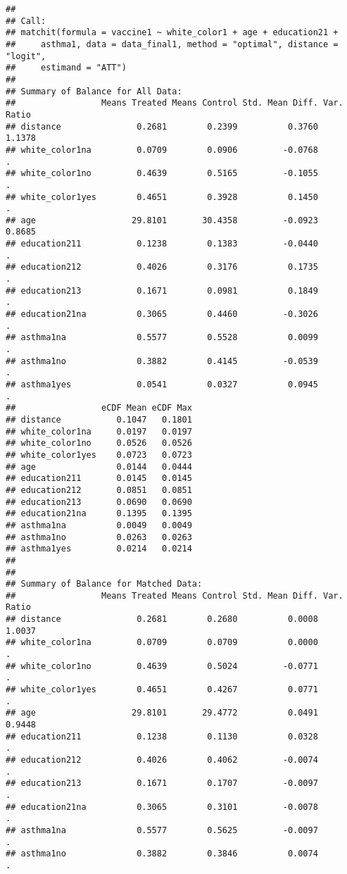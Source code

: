 \documentclass[
]{article}
\begin{document}
\begin{verbatim}
## 
## Call:
## matchit(formula = vaccine1 ~ white_color1 + age + education21 + 
##     asthma1, data = data_final1, method = "optimal", distance = "logit", 
##     estimand = "ATT")
## 
## Summary of Balance for All Data:
##                 Means Treated Means Control Std. Mean Diff. Var. Ratio
## distance               0.2681        0.2399          0.3760     1.1378
## white_color1na         0.0709        0.0906         -0.0768          .
## white_color1no         0.4639        0.5165         -0.1055          .
## white_color1yes        0.4651        0.3928          0.1450          .
## age                   29.8101       30.4358         -0.0923     0.8685
## education211           0.1238        0.1383         -0.0440          .
## education212           0.4026        0.3176          0.1735          .
## education213           0.1671        0.0981          0.1849          .
## education21na          0.3065        0.4460         -0.3026          .
## asthma1na              0.5577        0.5528          0.0099          .
## asthma1no              0.3882        0.4145         -0.0539          .
## asthma1yes             0.0541        0.0327          0.0945          .
##                 eCDF Mean eCDF Max
## distance           0.1047   0.1801
## white_color1na     0.0197   0.0197
## white_color1no     0.0526   0.0526
## white_color1yes    0.0723   0.0723
## age                0.0144   0.0444
## education211       0.0145   0.0145
## education212       0.0851   0.0851
## education213       0.0690   0.0690
## education21na      0.1395   0.1395
## asthma1na          0.0049   0.0049
## asthma1no          0.0263   0.0263
## asthma1yes         0.0214   0.0214
## 
## 
## Summary of Balance for Matched Data:
##                 Means Treated Means Control Std. Mean Diff. Var. Ratio
## distance               0.2681        0.2680          0.0008     1.0037
## white_color1na         0.0709        0.0709          0.0000          .
## white_color1no         0.4639        0.5024         -0.0771          .
## white_color1yes        0.4651        0.4267          0.0771          .
## age                   29.8101       29.4772          0.0491     0.9448
## education211           0.1238        0.1130          0.0328          .
## education212           0.4026        0.4062         -0.0074          .
## education213           0.1671        0.1707         -0.0097          .
## education21na          0.3065        0.3101         -0.0078          .
## asthma1na              0.5577        0.5625         -0.0097          .
## asthma1no              0.3882        0.3846          0.0074          .

\end{verbatim}
\end{document}
